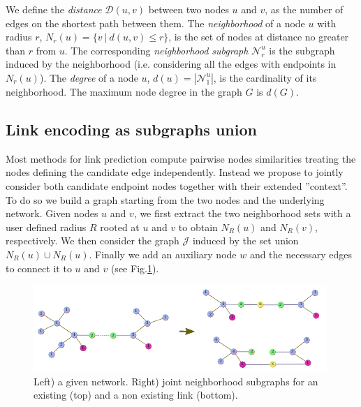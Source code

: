 \documentclass[runningheads,a4paper]{llncs}
\begin{document}
We define the \textit{distance} $\mathcal{D}(u,v)$ between two nodes $u$ and $v$, as the number of edges on the shortest path between them. The \textit{neighborhood} of a node $u$ with radius $r$, $N_r(u) = \lbrace v\ |\ d(u,v) \leq r \rbrace$, is the set of nodes at distance no greater than $r$ from $u$. The corresponding \textit{neighborhood subgraph} $\mathcal{N}_{r}^{u}$ is the  subgraph induced by the neighborhood (i.e. considering all the edges with endpoints in $N_r(u)$). The \textit{degree} of a node $u$, $d(u) = |\mathcal{N}_{1}^{u}|$, is the cardinality of its neighborhood. The maximum node degree in the graph $G$ is $d(G)$.



\subsection{Link encoding as subgraphs union}
\label{sec:link}
Most methods for link prediction compute pairwise nodes similarities treating  the nodes defining the candidate edge independently. Instead we propose to jointly consider both candidate endpoint nodes together with their extended ''context''. To do so we build a graph starting from the two nodes and the underlying network. Given nodes $u$ and $v$, we first extract the two neighborhood sets with a user defined radius $R$ rooted at $u$ and $v$ to obtain $N_R(u)$ and $N_R(v)$, respectively. We then consider the graph $\mathcal{J}$ induced by the set union $N_R(u) \cup N_R(u)$. Finally we add an auxiliary node $w$ and the necessary edges to connect it to $u$ and $v$ (see Fig.\ref{fig:example}).
\begin{figure}
\centering
\includegraphics[width=.9\textwidth]{subgraphs}
\caption{Left) a given network. Right) joint neighborhood subgraphs for an existing (top) and a non existing link (bottom).}
\label{fig:example}
\end{figure}
\end{document}

